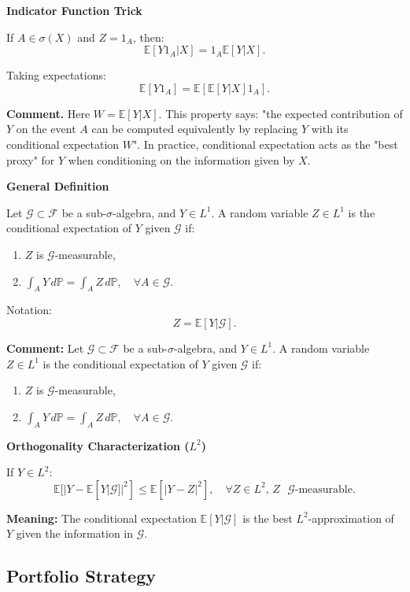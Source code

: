 \documentclass[12pt,a4paper]{article}
\theoremstyle{definition}
\newcommand{\E}{\mathbb{E}}
\newcommand{\Prob}{\mathbb{P}}
\begin{document}
\vspace{0.5em}
\textbf{Indicator Function Trick}

If $A \in \sigma(X)$ and $Z = 1_A$, then:
\[
\E[Y1_A|X] = 1_A \E[Y|X].
\]

Taking expectations:
\[
\E[Y1_A] = \E[\E[Y|X] 1_A].
\]

\textbf{Comment.}
Here $W = \E[Y|X]$. This property says: "the expected contribution of $Y$ on the event $A$ can be computed equivalently by replacing $Y$ with its conditional expectation $W$". In practice, conditional expectation acts as the "best proxy" for $Y$ when conditioning on the information given by $X$.

\vspace{0.5em}
\textbf{General Definition}

Let $\mathcal{G} \subset \mathcal{F}$ be a sub-$\sigma$-algebra, and $Y \in L^1$. A random variable $Z \in L^1$ is the conditional expectation of $Y$ given $\mathcal{G}$ if:
\begin{enumerate}
\item $Z$ is $\mathcal{G}$-measurable,
\item $\int_A Y \, d\Prob = \int_A Z \, d\Prob, \quad \forall A \in \mathcal{G}$.
\end{enumerate}

Notation:
\[
Z = \E[Y|\mathcal{G}].
\]

\textbf{Comment:} Let $\mathcal{G} \subset \mathcal{F}$ be a sub-$\sigma$-algebra, and $Y \in L^1$. A random variable $Z \in L^1$ is the conditional expectation of $Y$ given $\mathcal{G}$ if:
\begin{enumerate}
\item $Z$ is $\mathcal{G}$-measurable,
\item $\int_A Y \, d\Prob = \int_A Z \, d\Prob, \quad \forall A \in \mathcal{G}$.
\end{enumerate}

\vspace{0.5em}
\textbf{Orthogonality Characterization ($L^2$)}

If $Y \in L^2$:
\[
\E[|Y - \E[Y|\mathcal{G}]|^2] \leq \E[|Y - Z|^2], \quad \forall Z \in L^2, \, Z \text{ } \mathcal{G}\text{-measurable}.
\]

\textbf{Meaning:} The conditional expectation $\E[Y|\mathcal{G}]$ is the best $L^2$-approximation of $Y$ given the information in $\mathcal{G}$.

\subsection{Portfolio Strategy}
\end{document}
